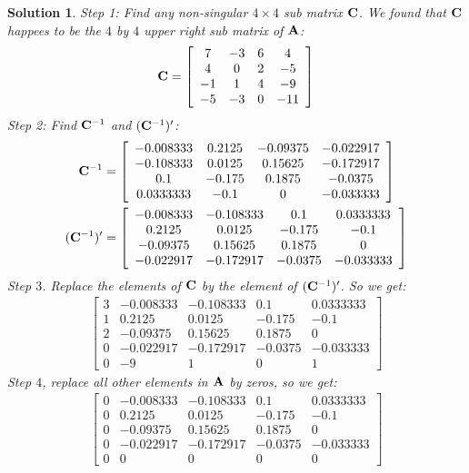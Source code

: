 \documentclass[11pt]{article}\usepackage[]{graphicx}\usepackage[]{color}
\newtheorem{sol}{Solution}
\begin{document}
\begin{sol}
	Step 1: Find any non-singular $4\times 4$ sub matrix ${\bf C}$.\vskip 2mm
	We found that ${\bf C}$ happees to be the $4$ by $4$ upper right sub matrix of ${\bf A}$:
	\begin{align*}
		{\bf C} = \left[\begin{array}{cccc} 7&-3&6&4 \\ 4&0&2&-5\\ -1&1&4&-9\\ -5&-3&0&-11\end{array}\right]
	\end{align*}
	Step 2: Find ${\bf C}^{-1}$ and $({\bf C}^{-1})'$:
	\begin{align*}
		{\bf C}^{-1} &= \left[\begin{array}{cccc} -0.008333&0.2125&-0.09375&-0.022917 \\ -0.108333&0.0125&0.15625&-0.172917\\ 0.1&-0.175&0.1875&-0.0375\\0.0333333 &-0.1&0&-0.033333\end{array}\right]\\
		({\bf C}^{-1})' &= \left[\begin{array}{cccc} -0.008333&-0.108333&0.1&0.0333333 \\0.2125 &0.0125&-0.175&-0.1\\-0.09375 &0.15625&0.1875&0\\-0.022917 &-0.172917&-0.0375&-0.033333\end{array}\right]
	\end{align*}
	Step $3$. Replace the elements of ${\bf C}$ by the element of $({\bf C}^{-1})'$. So we get:
	\begin{align*}
		\left[\begin{array}{ccccc}3 &-0.008333&-0.108333&0.1&0.0333333\\ 1&0.2125&0.0125&-0.175&-0.1\\ 2&-0.09375&0.15625&0.1875&0\\ 0&-0.022917&-0.172917&-0.0375&-0.033333\\ 0&-9&1&0&1\end{array}\right]
	\end{align*}
	Step $4$, replace all other elements in ${\bf A}$ by zeros, so we get:
	\begin{align*}
		\left[\begin{array}{ccccc}0 &-0.008333&-0.108333&0.1&0.0333333\\ 0&0.2125&0.0125&-0.175&-0.1\\ 0&-0.09375&0.15625&0.1875&0\\ 0&-0.022917&-0.172917&-0.0375&-0.033333\\ 0&0&0&0&0\end{array}\right]

\end{align*}
\end{sol}
\end{document}
